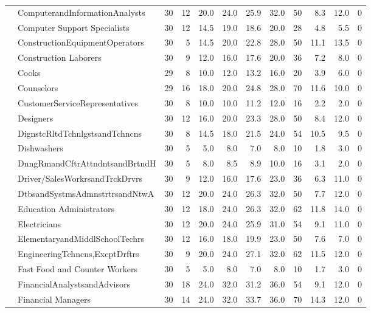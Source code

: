 {\begin{longtable}{llrrrrrrrrrr}
   & ComputerandInformationAnalysts &   30 & 12 & 20.0 & 24.0 & 25.9 & 32.0 & 50 &  8.3 & 12.0 & 0 \\ 
   & Computer Support Specialists &   30 & 12 & 14.5 & 19.0 & 18.6 & 20.0 & 28 &  4.8 &  5.5 & 0 \\ 
   & ConstructionEquipmentOperators &   30 &  5 & 14.5 & 20.0 & 22.8 & 28.0 & 50 & 11.1 & 13.5 & 0 \\ 
   & Construction Laborers &   30 &  9 & 12.0 & 16.0 & 17.6 & 20.0 & 36 &  7.2 &  8.0 & 0 \\ 
   & Cooks &   29 &  8 & 10.0 & 12.0 & 13.2 & 16.0 & 20 &  3.9 &  6.0 & 0 \\ 
   & Counselors &   29 & 16 & 18.0 & 20.0 & 24.8 & 28.0 & 70 & 11.6 & 10.0 & 0 \\ 
   & CustomerServiceRepresentatives &   30 &  8 & 10.0 & 10.0 & 11.2 & 12.0 & 16 &  2.2 &  2.0 & 0 \\ 
   & Designers &   30 & 12 & 16.0 & 20.0 & 23.3 & 28.0 & 50 &  8.4 & 12.0 & 0 \\ 
   & DignstcRltdTchnlgstsandTchncns &   30 &  8 & 14.5 & 18.0 & 21.5 & 24.0 & 54 & 10.5 &  9.5 & 0 \\ 
   & Dishwashers &   30 &  5 &  5.0 &  8.0 &  7.0 &  8.0 & 10 &  1.8 &  3.0 & 0 \\ 
   & DnngRmandCftrAttndntsandBrtndH &   30 &  5 &  8.0 &  8.5 &  8.9 & 10.0 & 16 &  3.1 &  2.0 & 0 \\ 
   & Driver/SalesWorkrsandTrckDrvrs &   30 &  9 & 12.0 & 16.0 & 17.6 & 23.0 & 36 &  6.3 & 11.0 & 0 \\ 
   & DtbsandSystmsAdmnstrtrsandNtwA &   30 & 12 & 20.0 & 24.0 & 26.3 & 32.0 & 50 &  7.7 & 12.0 & 0 \\ 
   & Education Administrators &   30 & 12 & 18.0 & 24.0 & 26.3 & 32.0 & 62 & 11.8 & 14.0 & 0 \\ 
   & Electricians &   30 & 12 & 20.0 & 24.0 & 25.9 & 31.0 & 54 &  9.1 & 11.0 & 0 \\ 
   & ElementaryandMiddlSchoolTechrs &   30 & 12 & 16.0 & 18.0 & 19.9 & 23.0 & 50 &  7.6 &  7.0 & 0 \\ 
   & EngineeringTchncns,ExcptDrftrs &   30 &  9 & 20.0 & 24.0 & 27.1 & 32.0 & 62 & 11.5 & 12.0 & 0 \\ 
   & Fast Food and Counter Workers &   30 &  5 &  5.0 &  8.0 &  7.0 &  8.0 & 10 &  1.7 &  3.0 & 0 \\ 
   & FinancialAnalystsandAdvisors &   30 & 18 & 24.0 & 32.0 & 31.2 & 36.0 & 54 &  9.1 & 12.0 & 0 \\ 
   & Financial Managers &   30 & 14 & 24.0 & 32.0 & 33.7 & 36.0 & 70 & 14.3 & 12.0 & 0 \\ 

\end{longtable}}
